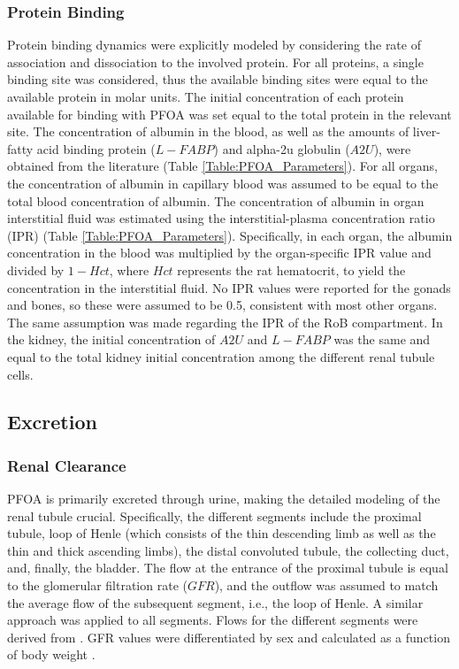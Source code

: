 \documentclass[preprint,12pt,authoryear]{elsarticle}
\begin{document}
\subsubsection{Protein Binding}
Protein binding dynamics were explicitly modeled by considering the rate of association and dissociation to the involved protein. For all proteins, a single binding site was considered, thus the available binding sites were equal to the available protein in molar units. The initial concentration of each protein available for binding with PFOA was set equal to the total protein in the relevant site. The concentration of albumin in the blood, as well as the amounts of  liver-fatty acid binding protein ($L-FABP$) and alpha-2u globulin ($A2U$), were obtained from the literature (Table \ref{Table:PFOA_Parameters}). For all organs, the concentration of albumin in capillary blood was assumed to be equal to the total blood concentration of albumin. The concentration of albumin in organ interstitial fluid was estimated using the interstitial-plasma concentration ratio (IPR) (Table \ref{Table:PFOA_Parameters}). Specifically, in each organ, the albumin concentration in the blood was multiplied by the organ-specific IPR value and divided by $1-Hct$, where $Hct$ represents the rat hematocrit, to yield the concentration in the interstitial fluid. No IPR values were reported for the gonads and bones, so these were assumed to be 0.5, consistent with most other organs. The same assumption was made regarding the IPR of the RoB compartment. In the kidney, the initial concentration of $A2U$ and $L-FABP$ was the same and equal to the total kidney initial concentration among the different renal tubule cells.


 \subsection{Excretion}
\subsubsection{Renal Clearance}
PFOA is primarily excreted through urine, making the detailed modeling of the renal tubule crucial. Specifically, the different segments include the proximal tubule, loop of Henle (which consists of the thin descending limb as well as the thin and thick ascending limbs), the distal convoluted tubule, the collecting duct, and, finally, the bladder. The flow at the entrance of the proximal tubule is equal to the glomerular filtration rate ($GFR$), and the outflow was assumed to match the average flow of the subsequent segment, i.e., the loop of Henle. A similar approach was applied to all segments. Flows for the different segments were derived from \citet{gilmer_2018}. GFR values were differentiated by sex and calculated as a function of body weight \citep{corley_2005}.
\end{document}
